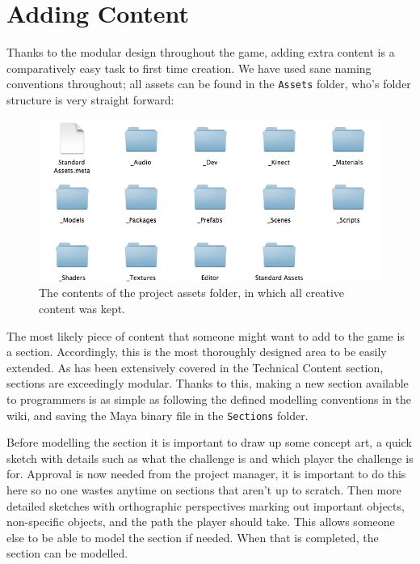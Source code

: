 \documentclass[a4paper,oneside]{memoir}
\begin{document}
		\section{Adding Content}

			Thanks to the modular design throughout the game, adding extra content is a comparatively easy task to first time creation.
			We have used sane naming conventions throughout; all assets can be found in the \texttt{Assets} folder, who's folder structure is very straight forward:

			\begin{figure}[ht]
				\begin{center}
					\includegraphics[width=140mm]{"../Screenshots/asset-layout"}
					\caption{The contents of the project assets folder, in which all creative content was kept.}
					\label{fig:AssetsFolder}
				\end{center}
			\end{figure}

			The most likely piece of content that someone might want to add to the game is a section. 
			Accordingly, this is the most thoroughly designed area to be easily extended.
			As has been extensively covered in the Technical Content section, sections are exceedingly modular.
			Thanks to this, making a new section available to programmers is as simple as following the defined modelling conventions in the wiki, and saving the Maya binary file in the \texttt{Sections} folder.

			Before modelling the section it is important to draw up some concept art, a quick sketch with details such as what the challenge is and which player the challenge is for.
			Approval is now needed from the project manager, it is important to do this here so no one wastes anytime on sections that aren't up to scratch.
			Then more detailed sketches with orthographic perspectives marking out important objects, non-specific objects, and the path the player should take. This allows someone else to be able to model the section if needed.
			When that is completed, the section can be modelled. 
\end{document}
